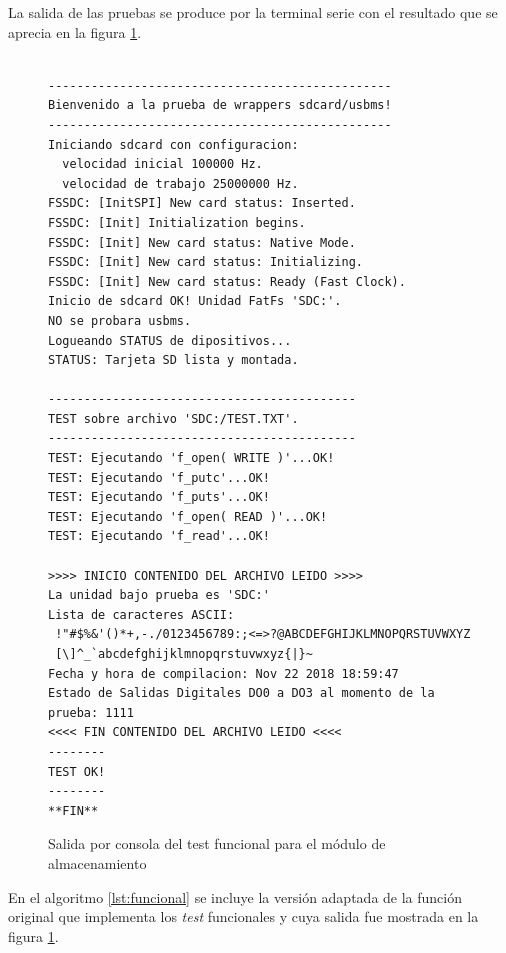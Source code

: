 La salida de las pruebas se produce por la terminal serie con el resultado que se aprecia en la figura \ref{fig:test_funcional}.

\begin{figure}[htpb]
\begin{center}
\begin{verbatim}

------------------------------------------------
Bienvenido a la prueba de wrappers sdcard/usbms!
------------------------------------------------
Iniciando sdcard con configuracion:
  velocidad inicial 100000 Hz.
  velocidad de trabajo 25000000 Hz.
FSSDC: [InitSPI] New card status: Inserted.
FSSDC: [Init] Initialization begins.
FSSDC: [Init] New card status: Native Mode.
FSSDC: [Init] New card status: Initializing.
FSSDC: [Init] New card status: Ready (Fast Clock).
Inicio de sdcard OK! Unidad FatFs 'SDC:'.
NO se probara usbms.
Logueando STATUS de dipositivos...
STATUS: Tarjeta SD lista y montada.

-------------------------------------------
TEST sobre archivo 'SDC:/TEST.TXT'.
-------------------------------------------
TEST: Ejecutando 'f_open( WRITE )'...OK!
TEST: Ejecutando 'f_putc'...OK!
TEST: Ejecutando 'f_puts'...OK!
TEST: Ejecutando 'f_open( READ )'...OK!
TEST: Ejecutando 'f_read'...OK!

>>>> INICIO CONTENIDO DEL ARCHIVO LEIDO >>>>
La unidad bajo prueba es 'SDC:'
Lista de caracteres ASCII:
 !"#$%&'()*+,-./0123456789:;<=>?@ABCDEFGHIJKLMNOPQRSTUVWXYZ
 [\]^_`abcdefghijklmnopqrstuvwxyz{|}~
Fecha y hora de compilacion: Nov 22 2018 18:59:47
Estado de Salidas Digitales DO0 a DO3 al momento de la prueba: 1111
<<<< FIN CONTENIDO DEL ARCHIVO LEIDO <<<<
--------
TEST OK!
--------
**FIN**
\end{verbatim}
\end{center}
\caption{Salida por consola del test funcional para el módulo de almacenamiento}
\label{fig:test_funcional}
\end{figure}


%


En el algoritmo \ref{lst:funcional} se incluye la versión adaptada de la función original que implementa los \textit{test} funcionales y cuya salida fue mostrada en la figura \ref{fig:test_funcional}. %

